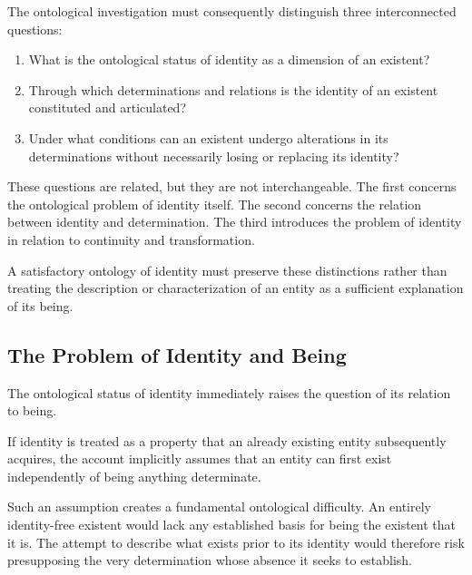 The ontological investigation must consequently
distinguish three interconnected questions:

\begin{enumerate}
    \item What is the ontological status of identity
    as a dimension of an existent?

    \item Through which determinations and relations
    is the identity of an existent constituted
    and articulated?

    \item Under what conditions can an existent
    undergo alterations in its determinations
    without necessarily losing or replacing
    its identity?
\end{enumerate}

These questions are related, but they are not
interchangeable. The first concerns the ontological
problem of identity itself. The second concerns
the relation between identity and determination.
The third introduces the problem of identity
in relation to continuity and transformation.

A satisfactory ontology of identity must preserve
these distinctions rather than treating the
description or characterization of an entity
as a sufficient explanation of its being.



\subsection{The Problem of Identity and Being}
\label{subsec:identity-and-being-problem}

The ontological status of identity immediately
raises the question of its relation to being.

If identity is treated as a property that an
already existing entity subsequently acquires,
the account implicitly assumes that an entity
can first exist independently of being anything
determinate.

Such an assumption creates a fundamental
ontological difficulty. An entirely identity-free
existent would lack any established basis for
being the existent that it is. The attempt to
describe what exists prior to its identity
would therefore risk presupposing the very
determination whose absence it seeks to establish.

